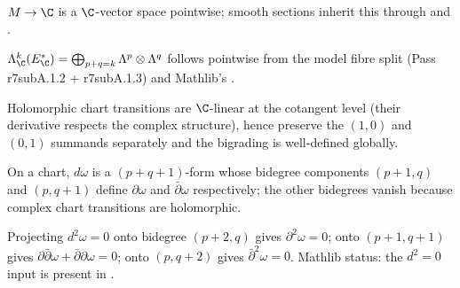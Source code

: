 \begin{lemma}
\label{lem:r7subA-sec-r1}
\(M\to\C\) is a \(\C\)-vector space pointwise; smooth sections
inherit this through  and
.
\leanok\mathlibok
\end{lemma}

\begin{lemma}[Pass r7subA.4.1: complexification = direct sum by bidegree]
\label{lem:r7subA-omeq-r1}
\(\Lambda^{k}_{\C}(E^{*}_{\C}) = \bigoplus_{p+q=k} \Lambda^{p}\otimes\Lambda^{q}\)
follows pointwise from the model fibre split (Pass r7subA.1.2 +
r7subA.1.3) and Mathlib's .
\leanok
\end{lemma}

\begin{lemma}
\label{lem:r7subA-omeq-r2}
Holomorphic chart transitions are \(\C\)-linear at the cotangent
level (their derivative respects the complex structure), hence
preserve the \((1,0)\) and \((0,1)\) summands separately and the
bigrading is well-defined globally.
\leanok
\end{lemma}

\begin{lemma}
\label{lem:r7subA-dsplit-r1}
On a chart, \(d\omega\) is a \((p+q+1)\)-form whose bidegree
components \((p+1,q)\) and \((p,q+1)\) define \(\partial\omega\)
and \(\bar\partial\omega\) respectively; the other bidegrees
vanish because complex chart transitions are holomorphic.
\leanok
\end{lemma}

\begin{lemma}[Pass r7subA.5.2: algebraic identities from \(d^{2}=0\)]
\label{lem:r7subA-dsplit-r2}
Projecting \(d^{2}\omega=0\) onto bidegree \((p+2,q)\) gives
\(\partial^{2}\omega=0\); onto \((p+1,q+1)\) gives
\(\partial\bar\partial\omega+\bar\partial\partial\omega=0\); onto
\((p,q+2)\) gives \(\bar\partial^{2}\omega=0\).  Mathlib status:
the \(d^{2}=0\) input is present in
.
\leanok
\end{lemma}

